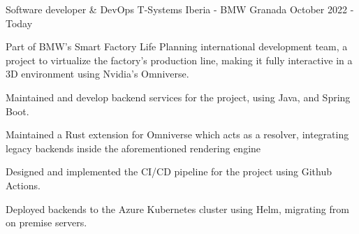 
\begin{cventries}
  \cventry
    {Software developer \& DevOps} %
    {T-Systems Iberia - BMW} %
    {Granada} %
    {October 2022 - Today} %
    {
      \begin{cvitems} %
        \item {Part of BMW's Smart Factory Life Planning international development team, a project to virtualize the factory's production line, making it fully interactive in a 3D environment using Nvidia's Omniverse.}
        \item {Maintained and develop backend services for the project, using Java, and Spring Boot.}
        \item {Maintained a Rust extension for Omniverse which acts as a resolver, integrating legacy backends inside the aforementioned rendering engine}
        \item {Designed and implemented the CI/CD pipeline for the project using Github Actions.}
        \item {Deployed backends to the Azure Kubernetes cluster using Helm, migrating from on premise servers.}
      \end{cvitems}
    }
\end{cventries}
